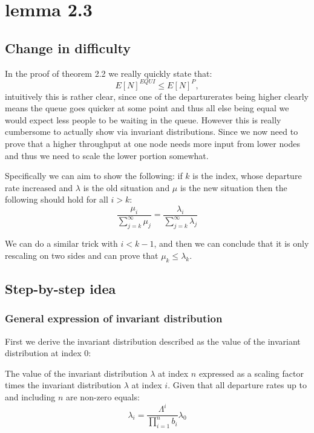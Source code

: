 \chapter{lemma 2.3}\label{ch_lemma2_3}

\section{Change in difficulty}
In the proof of theorem 2.2 we really quickly state that:
$$E[N]^{EQUI} \leq E[N]^P,$$
intuitively this is rather clear, since one of the departurerates being higher clearly means the
queue goes quicker at some point and thus all else being equal we would expect less people to be waiting
in the queue. However this is really cumbersome to actually show via invariant distributions.
Since we now need to prove that a higher throughput at one node needs more input from lower nodes
and thus we need to scale the lower portion somewhat.

Specifically we can aim to show the following:
if $k$ is the index, whose departure rate increased and $\lambda$ is the old situation and $\mu$
is the new situation then the following should hold for all $i > k$:
$$\frac{\mu_i}{\sum_{j=k}^\infty \mu_j} = \frac{\lambda_i}{\sum_{j=k}^\infty \lambda_j}$$

We can do a similar trick with $i < k - 1$, and then we can conclude that it is only rescaling on two
sides and can prove that $\mu_k \leq \lambda_k$.


\section{Step-by-step idea}

\subsection{General expression of invariant distribution}
First we derive the invariant distribution described as the value of the
invariant distribution at index $0$:
\begin{lemma}\label{lem:InvariantDistributionValue}
  The value of the invariant distribution $\lambda$ at index $n$ expressed as a scaling factor times the
  invariant distribution $\lambda$ at index $i$. Given that all departure rates up to and including
  $n$ are non-zero equals:
  $$\lambda_i = \frac{\Lambda^{i}}{\prod_{i=1}^n b_i} \lambda_0$$
\end{lemma}

